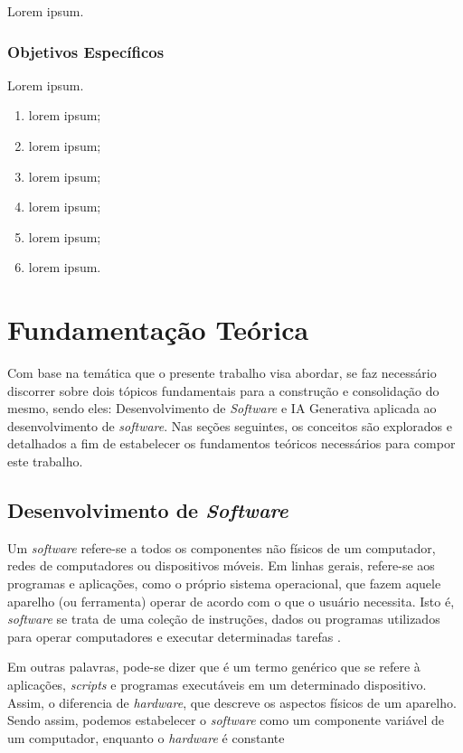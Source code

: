 \documentclass[english,brazilian]{UNISINOSartigo} %
\begin{document}
Lorem ipsum.

\subsubsection{Objetivos Específicos}

Lorem ipsum.
\begin{enumerate}[label=\alph*), leftmargin=1.2cm, itemsep=0.1em, topsep=0.1em]
    \item lorem ipsum;
    \item lorem ipsum;
    \item lorem ipsum;
    \item lorem ipsum;
    \item lorem ipsum;
    \item lorem ipsum.
\end{enumerate}

\section{Fundamentação Teórica}

Com base na temática que o presente trabalho visa abordar, se faz necessário discorrer sobre dois tópicos fundamentais para a construção e consolidação do mesmo, sendo eles: Desenvolvimento de \textit{Software} e IA Generativa aplicada ao desenvolvimento de \textit{software}. Nas seções seguintes, os conceitos são explorados e detalhados a fim de estabelecer os fundamentos teóricos necessários para compor este trabalho.

\subsection{Desenvolvimento de \textit{Software}}

Um \textit{software} refere-se a todos os componentes não físicos de um computador, redes de computadores ou dispositivos móveis. Em linhas gerais, refere-se aos programas e aplicações, como o próprio sistema operacional, que fazem aquele aparelho (ou ferramenta) operar de acordo com o que o usuário necessita. Isto é, \textit{software} se trata de uma coleção de instruções, dados ou programas utilizados para operar computadores e executar determinadas tarefas \cite{coutinho2021}.

Em outras palavras, pode-se dizer que é um termo genérico que se refere à aplicações, \textit{scripts} e programas executáveis em um determinado dispositivo. Assim, o diferencia de \textit{hardware}, que descreve os aspectos físicos de um aparelho. Sendo assim, podemos estabelecer o \textit{software} como um componente variável de um computador, enquanto o \textit{hardware} é constante \cite{sakurai2018}
\end{document}
